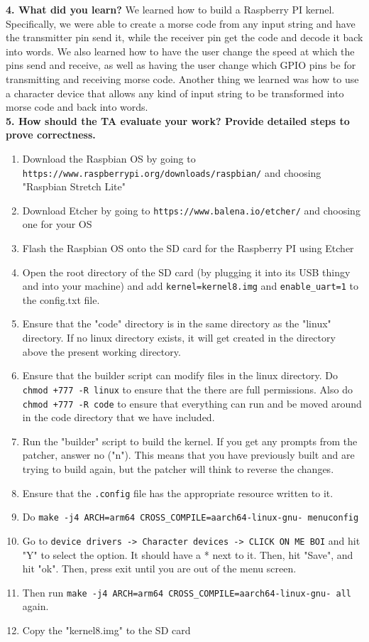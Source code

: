 \documentclass[10pt,english]{article}
\begin{document}
\noindent \textbf{4. What did you learn?}
We learned how to build a Raspberry PI kernel. Specifically, we were able to create a morse code from any input string and have the transmitter pin send it, while the receiver pin get the code and decode it back into words. We also learned how to have the user change the speed at which the pins send and receive, as well as having the user change which GPIO pins be for transmitting and receiving morse code. Another thing we learned was how to use a character device that allows any kind of input string to be transformed into morse code and back into words. \\

\noindent \textbf{5. How should the TA evaluate your work? Provide detailed steps to prove correctness.}
\begin{enumerate}
\item Download the Raspbian OS by going to \verb|https://www.raspberrypi.org/downloads/raspbian/| and choosing "Raspbian Stretch Lite"
\item Download Etcher by going to \verb|https://www.balena.io/etcher/| and choosing one for your OS
\item Flash the Raspbian OS onto the SD card for the Raspberry PI using Etcher
\item Open the root directory of the SD card (by plugging it into its USB thingy and into your machine) and add \verb|kernel=kernel8.img| and \verb|enable_uart=1| to the config.txt file.
\item Ensure that the "code" directory is in the same directory as the "linux" directory. If no linux directory exists, it will get created in the directory above the present working directory.
\item Ensure that the builder script can modify files in the linux directory. Do \verb|chmod +777 -R linux| to ensure that the there are full permissions. Also do \verb|chmod +777 -R code| to ensure that everything can run and be moved around in the code directory that we have included.
\item Run the "builder" script to build the kernel. If you get any prompts from the patcher, answer no ("n"). This means that you have previously built and are trying to build again, but the patcher will think to reverse the changes.
\item Ensure that the \verb|.config| file has the appropriate resource written to it. 
\item Do \verb|make -j4 ARCH=arm64 CROSS_COMPILE=aarch64-linux-gnu- menuconfig| 
\item Go to \verb|device drivers -> Character devices -> CLICK ON ME BOI| and hit "Y" to select the option. It should have a * next to it. Then, hit "Save", and hit "ok". Then, press exit until you are out of the menu screen. 
\item Then run \verb|make -j4 ARCH=arm64 CROSS_COMPILE=aarch64-linux-gnu- all| again.
\item Copy the "kernel8.img" to the SD card \\
\end{enumerate}
\end{document}
